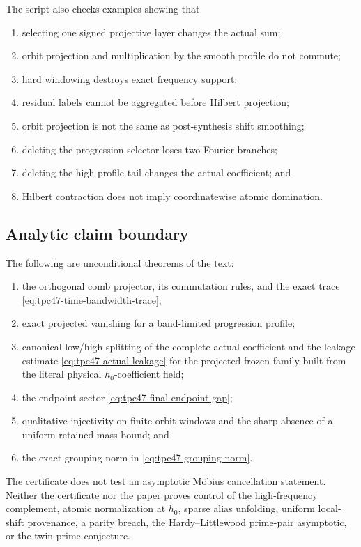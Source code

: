 The script also checks examples showing that
\begin{enumerate}[label=\textup{(\roman*)},leftmargin=2.4em]
 \item selecting one signed projective layer changes the actual sum;
 \item orbit projection and multiplication by the smooth profile do not
       commute;
 \item hard windowing destroys exact frequency support;
 \item residual labels cannot be aggregated before Hilbert projection;
 \item orbit projection is not the same as post-synthesis shift
       smoothing;
 \item deleting the progression selector loses two Fourier branches;
 \item deleting the high profile tail changes the actual coefficient;
       and
 \item Hilbert contraction does not imply coordinatewise atomic
       domination.
\end{enumerate}

\subsection{Analytic claim boundary}

The following are unconditional theorems of the text:
\begin{enumerate}[label=\arabic*.,leftmargin=2em]
 \item the orthogonal comb projector, its commutation rules, and the
       exact trace \eqref{eq:tpc47-time-bandwidth-trace};
 \item exact projected vanishing for a band-limited progression profile;
 \item canonical low/high splitting of the complete actual coefficient
       and the leakage estimate \eqref{eq:tpc47-actual-leakage} for the
       projected frozen family built from the literal physical
       \(h_0\)-coefficient field;
 \item the endpoint sector \eqref{eq:tpc47-final-endpoint-gap};
 \item qualitative injectivity on finite orbit windows and the sharp
       absence of a uniform retained-mass bound; and
 \item the exact grouping norm in
       \eqref{eq:tpc47-grouping-norm}.
\end{enumerate}

The certificate does not test an asymptotic M\"obius cancellation
statement.  Neither the certificate nor the paper proves control of the
high-frequency complement, atomic normalization at \(h_0\), sparse
alias unfolding, uniform local-shift provenance, a parity breach, the
Hardy--Littlewood prime-pair asymptotic, or the twin-prime conjecture.
